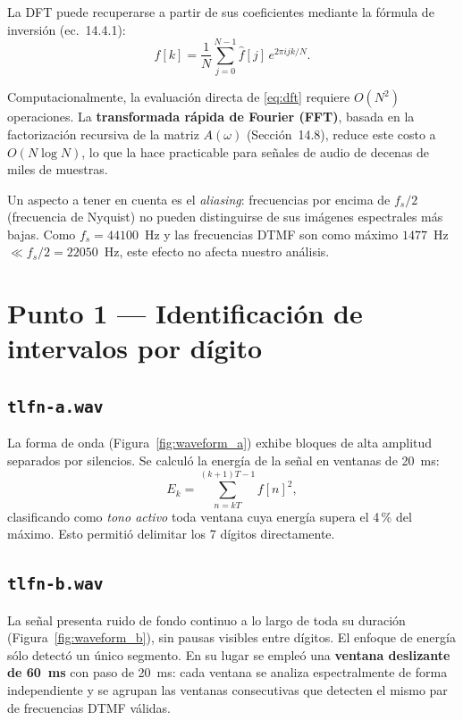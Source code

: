 \documentclass[]{report}
\begin{document}
La DFT puede recuperarse a partir de sus coeficientes mediante la fórmula de
inversión (ec.~14.4.1):
\begin{equation}
f[k] = \frac{1}{N}\sum_{j=0}^{N-1} \hat{f}[j]\, e^{2\pi ijk/N}.
\end{equation}

Computacionalmente, la evaluación directa de \eqref{eq:dft} requiere $O(N^2)$
operaciones. La \textbf{transformada rápida de Fourier (FFT)}, basada en la
factorización recursiva de la matriz $A(\omega)$ (Sección~14.8), reduce este
costo a $O(N \log N)$, lo que la hace practicable para señales de audio de
decenas de miles de muestras.

Un aspecto a tener en cuenta es el \textit{aliasing}: frecuencias por encima de
$f_s/2$ (frecuencia de Nyquist) no pueden distinguirse de sus imágenes espectrales
más bajas. Como $f_s = 44100$~Hz y las frecuencias DTMF son como máximo
$1477$~Hz~$\ll f_s/2 = 22050$~Hz, este efecto no afecta nuestro análisis.

\section*{Punto 1 — Identificación de intervalos por dígito}

\subsection*{\texttt{tlfn-a.wav}}

La forma de onda (Figura~\ref{fig:waveform_a}) exhibe bloques de alta amplitud
separados por silencios. Se calculó la energía de la señal en ventanas de 20~ms:
$$
E_k = \sum_{n=kT}^{(k+1)T-1} f[n]^2,
$$
clasificando como \textit{tono activo} toda ventana cuya energía supera el 4\,\%
del máximo. Esto permitió delimitar los 7 dígitos directamente.

\subsection*{\texttt{tlfn-b.wav}}

La señal presenta ruido de fondo continuo a lo largo de toda su duración
(Figura~\ref{fig:waveform_b}), sin pausas visibles entre dígitos. El enfoque de
energía sólo detectó un único segmento. En su lugar se empleó una
\textbf{ventana deslizante de 60~ms} con paso de 20~ms: cada ventana se analiza
espectralmente de forma independiente y se agrupan las ventanas consecutivas que
detecten el mismo par de frecuencias DTMF válidas. \\[1cm]
\end{document}
